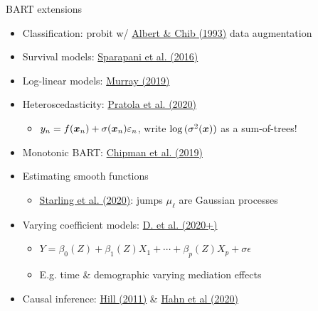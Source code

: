 \documentclass[aspectratio=199]{beamer}
\begin{document}
\begin{frame}{BART extensions}

\begin{itemize}
\item{Classification: probit w/ \href{https://www.tandfonline.com/doi/abs/10.1080/01621459.1993.10476321}{Albert \& Chib (1993)} data augmentation}
\item{Survival models: \href{https://onlinelibrary.wiley.com/doi/abs/10.1002/sim.6893}{Sparapani et al. (2016)}}
\item{Log-linear models: \href{https://arxiv.org/abs/1701.01503}{Murray (2019)}}
\item{Heteroscedasticity: \href{https://www.tandfonline.com/doi/abs/10.1080/10618600.2019.1677243?journalCode=ucgs20}{Pratola et al. (2020)}}
\begin{itemize}
\item{$y_{n} = f(\bm{x}_{n}) + \sigma(\bm{x}_{n})\varepsilon_{n}$, write $\log{(\sigma^{2}(\bm{x}))}$ as a sum-of-trees! }
\end{itemize}
\item{Monotonic BART: \href{https://arxiv.org/abs/1612.01619}{Chipman et al. (2019)}}
\item{Estimating smooth functions}
\begin{itemize}
\item{\href{https://projecteuclid.org/journals/annals-of-applied-statistics/volume-14/issue-1/BART-with-targeted-smoothing--An-analysis-of-patient-specific/10.1214/19-AOAS1268.short}{Starling et al. (2020)}: jumps $\mu_{\ell}$ are Gaussian processes}
\end{itemize}
\item{Varying coefficient models: \href{https://arxiv.org/abs/2003.06416}{D. et al. (2020+)}}
\begin{itemize}
\item{$Y = \beta_{0}(Z) + \beta_{1}(Z)X_{1} + \cdots + \beta_{p}(Z)X_{p} + \sigma\epsilon$}
\item{E.g. time \& demographic varying mediation effects}
\end{itemize}
\item{Causal inference: \href{https://www.tandfonline.com/doi/abs/10.1198/jcgs.2010.08162}{Hill (2011)} \& \href{https://projecteuclid.org/journals/bayesian-analysis/volume-15/issue-3/Bayesian-Regression-Tree-Models-for-Causal-Inference--Regularization-Confounding/10.1214/19-BA1195.full}{Hahn et al (2020)}}
\end{itemize}

\end{frame}
\end{document}
